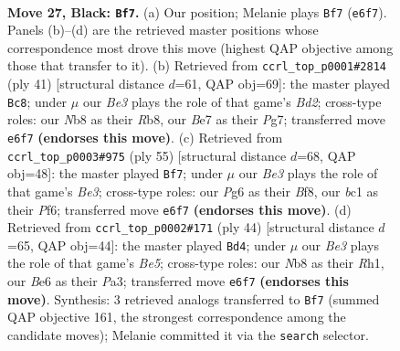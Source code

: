 \documentclass[11pt]{article}
\begin{document}
\clearpage

\begin{figure}[p]\centering
\begin{subfigure}{0.46\textwidth}\centering
\resizebox{\linewidth}{!}{%
\newchessgame
\chessboard[
  setfen={rn3r2/1p1kb2p/4b1pP/p2pPp2/3N4/P5P1/6K1/RNB2R2 b - - 1 27},
  showmover=false,
  pgfstyle=straightmove, color=movearrow, markmove={e6-f7}
]}
\caption{}
\end{subfigure}\hfill
\begin{subfigure}{0.46\textwidth}\centering
\resizebox{\linewidth}{!}{%
\newchessgame
\chessboard[
  setfen={1r2k2r/3b1ppp/2n1p3/p1N1P1P1/8/2P4R/2P3P1/2KR1B2 b k - 2 21},
  showmover=false,
  pgfstyle=straightmove, color=movearrow, markmove={d7-c8}
]}
\caption{}
\end{subfigure}
\\[4pt]
\begin{subfigure}{0.46\textwidth}\centering
\resizebox{\linewidth}{!}{%
\newchessgame
\chessboard[
  setfen={2k2b1r/pp4pp/3nbp2/1PN5/P6R/2B1N3/4KPPP/8 b - - 6 28},
  showmover=false,
  pgfstyle=straightmove, color=movearrow, markmove={e6-f7}
]}
\caption{}
\end{subfigure}\hfill
\begin{subfigure}{0.46\textwidth}\centering
\resizebox{\linewidth}{!}{%
\newchessgame
\chessboard[
  setfen={2b2rk1/4p2p/pp4p1/2rPB3/2n1P3/P1NR4/1P4PP/4K2R w K - 1 23},
  showmover=false,
  pgfstyle=straightmove, color=movearrow, markmove={e5-d4}
]}
\caption{}
\end{subfigure}
\caption{\textbf{Move 27, Black: \texttt{Bf7}.} (a) Our position; Melanie plays \texttt{Bf7} (\texttt{e6f7}). Panels (b)--(d) are the retrieved master positions whose correspondence most drove this move (highest QAP objective among those that transfer to it). (b) Retrieved from \texttt{ccrl\_top\_p0001\#2814} (ply 41) [structural distance $d$=61, QAP obj=69]: the master played \texttt{Bc8}; under $\mu$ our \emph{Be3} plays the role of that game's \emph{Bd2}; cross-type roles: our \emph{N}b8 as their \emph{R}b8, our \emph{B}e7 as their \emph{P}g7; transferred move \texttt{e6f7} \textbf{(endorses this move)}. (c) Retrieved from \texttt{ccrl\_top\_p0003\#975} (ply 55) [structural distance $d$=68, QAP obj=48]: the master played \texttt{Bf7}; under $\mu$ our \emph{Be3} plays the role of that game's \emph{Be3}; cross-type roles: our \emph{P}g6 as their \emph{B}f8, our \emph{b}c1 as their \emph{P}f6; transferred move \texttt{e6f7} \textbf{(endorses this move)}. (d) Retrieved from \texttt{ccrl\_top\_p0002\#171} (ply 44) [structural distance $d$=65, QAP obj=44]: the master played \texttt{Bd4}; under $\mu$ our \emph{Be3} plays the role of that game's \emph{Be5}; cross-type roles: our \emph{N}b8 as their \emph{R}h1, our \emph{B}e6 as their \emph{P}a3; transferred move \texttt{e6f7} \textbf{(endorses this move)}. Synthesis: 3 retrieved analogs transferred to \texttt{Bf7} (summed QAP objective 161, the strongest correspondence among the candidate moves); Melanie committed it via the \texttt{search} selector.}
\label{fig:thought-m53}
\end{figure}
\end{document}
